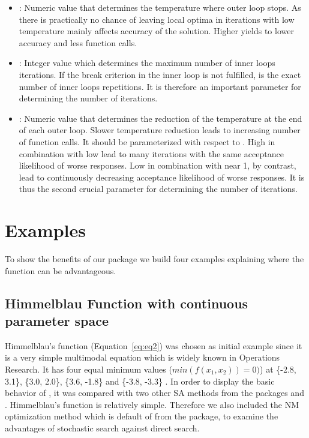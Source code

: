 \begin{itemize}
\item {}: Numeric value that determines the temperature where outer loop stops. As there is practically no chance of leaving local optima in iterations with low temperature  mainly affects accuracy of the solution. Higher  yields to lower accuracy and less function calls.
\item {}: Integer value which determines the maximum number of inner loops iterations. If the break criterion in the inner loop is not fulfilled,  is the exact number of inner loops repetitions. It is therefore an important parameter for determining the number of iterations.
\item {}: Numeric value that determines the reduction of the temperature at the end of each outer loop. Slower temperature reduction leads to increasing number of function calls. It should be parameterized with respect to . High  in combination with low  lead to many iterations with the same acceptance likelihood of worse responses. Low  in combination with  near 1, by contrast, lead to continuously decreasing acceptance likelihood of worse responses. It is thus the second crucial parameter for determining the number of iterations.
\end{itemize}

\section{Examples}
To show the benefits of our  package we build four examples explaining where the  function can be advantageous.

\subsection{Himmelblau Function with continuous parameter space}
Himmelblau's function (Equation~\eqref{eq:eq2}) \citep{himmelblau_1972} was chosen as initial example since it is a very simple multimodal equation which is widely known in Operations Research. It has four equal minimum values ($min(f(x_1,x_2))=0)$) at \{-2.8, 3.1\}, \{3.0, 2.0\}, \{3.6, -1.8\} and \{-3.8, -3.3\} . In order to display the basic behavior of , it was compared with two other SA methods from the packages  and . Himmelblau's function is relatively simple. Therefore we  also included the NM optimization method \citep{nelder_1965} which is default of  from the  package, to examine the advantages of stochastic search against direct search.

